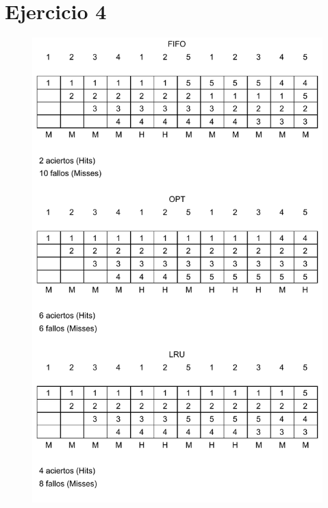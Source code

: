 \documentclass[11pt]{article}
\begin{document}
\newpage
\section*{Ejercicio 4}

\begin{figure}[h!]
  \begin{center}
    \includegraphics[width=0.85\linewidth]{Paginación.pdf}
  \end{center}
\end{figure}
\end{document}
